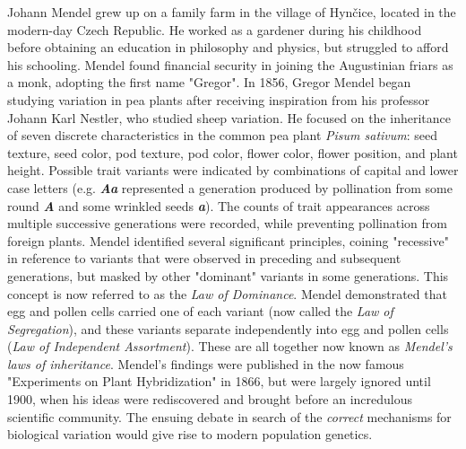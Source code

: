 Johann Mendel grew up on a family farm in the village of Hynčice, located in the modern-day Czech Republic. He worked as a gardener during his childhood before obtaining an education in philosophy and physics, but struggled to afford his schooling. Mendel found financial security in joining the Augustinian friars as a monk, adopting the first name "Gregor".  In 1856, Gregor Mendel began studying variation in pea plants after receiving inspiration from his professor Johann Karl Nestler, who studied sheep variation.\cite{henig_2000} He focused on the inheritance of seven discrete characteristics in the common pea plant \textit{Pisum sativum}: seed texture, seed color, pod texture, pod color, flower color, flower position, and plant height. Possible trait variants were indicated by combinations of capital and lower case letters (e.g. \textbf{\textit{Aa}} represented a generation produced by pollination from some round \textbf{\textit{A}} and some wrinkled seeds \textbf{\textit{a}}). The counts of trait appearances across multiple successive generations were recorded, while preventing pollination from foreign plants. Mendel identified several significant principles, coining "recessive" in reference to variants that were observed in preceding and subsequent generations, but masked by other "dominant" variants in some generations. This concept is now referred to as the \textit{Law of Dominance}. Mendel demonstrated that egg and pollen cells carried one of each variant (now called the \textit{Law of Segregation}), and these variants separate independently into egg and pollen cells (\textit{Law of Independent Assortment}). These are all together now known as \textit{Mendel's laws of inheritance}. Mendel's findings were published in the now famous "Experiments on Plant Hybridization" \cite{mendel_1865} in 1866, but were largely ignored until 1900, when his ideas were rediscovered and brought before an incredulous scientific community. The ensuing debate in search of the \textit{correct} mechanisms for biological variation would give rise to modern population genetics. \cite{bowler_2003}



\newpage

